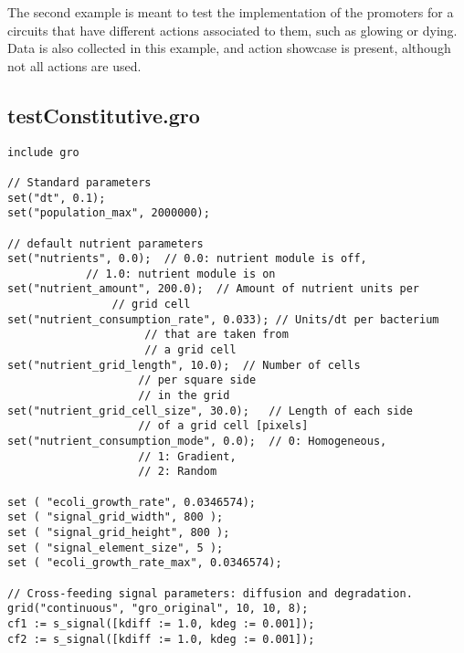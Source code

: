\documentclass[10pt,a4paper]{article}
\begin{document}
\newpage

The second example is meant to test the implementation of the promoters for a circuits that have different actions associated to them, such as glowing or dying. Data is also collected in this example, and action showcase is present, although not all actions are used.

\subsection{testConstitutive.gro}

\begin{Verbatim}[obeytabs]
include gro

// Standard parameters
set("dt", 0.1);
set("population_max", 2000000);

// default nutrient parameters
set("nutrients", 0.0);	// 0.0: nutrient module is off, 
			// 1.0: nutrient module is on
set("nutrient_amount", 200.0);	// Amount of nutrient units per 
				// grid cell
set("nutrient_consumption_rate", 0.033); // Units/dt per bacterium 
					 // that are taken from
					 // a grid cell
set("nutrient_grid_length", 10.0);	// Number of cells 
					// per square side
					// in the grid
set("nutrient_grid_cell_size", 30.0);	// Length of each side 
					// of a grid cell [pixels]
set("nutrient_consumption_mode", 0.0);	// 0: Homogeneous,
					// 1: Gradient,
					// 2: Random

set ( "ecoli_growth_rate", 0.0346574);
set ( "signal_grid_width", 800 );
set ( "signal_grid_height", 800 );
set ( "signal_element_size", 5 );
set ( "ecoli_growth_rate_max", 0.0346574);

// Cross-feeding signal parameters: diffusion and degradation.
grid("continuous", "gro_original", 10, 10, 8);
cf1 := s_signal([kdiff := 1.0, kdeg := 0.001]);
cf2 := s_signal([kdiff := 1.0, kdeg := 0.001]);
\end{Verbatim}
\end{document}
